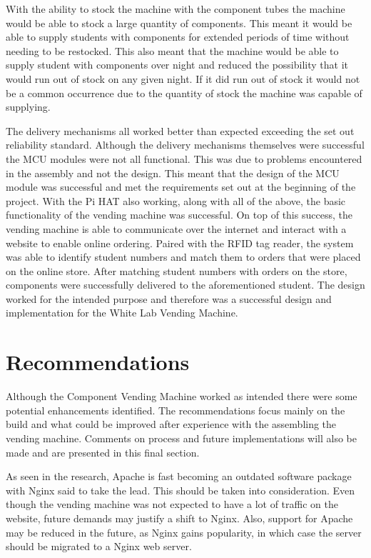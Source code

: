 \documentclass[a4paper,11pt]{article}
\numberwithin{figure}{section}
\numberwithin{table}{section}
\begin{document}
With the ability to stock the machine with the component tubes the machine would be able to stock a large quantity of components. This meant it would be able to supply students with components for extended periods of time without needing to be restocked. This also meant that the machine would be able to supply student with components over night and reduced the possibility that it would run out of stock on any given night. If it did run out of stock it would not be a common occurrence due to the quantity of stock the machine was capable of supplying.

The delivery mechanisms all worked better than expected exceeding the set out reliability standard. Although the delivery mechanisms themselves were successful the MCU modules were not all functional. This was due to problems encountered in the assembly and not the design. This meant that the design of the MCU module was successful and met the requirements set out at the beginning of the project. With the Pi HAT also working, along with all of the above, the basic functionality of the vending machine was successful. On top of this success, the vending machine is able to communicate over the internet and interact with a website to enable online ordering. Paired with the RFID tag reader, the system was able to identify student numbers and match them to orders that were placed on the online store. After matching student numbers with orders on the store, components were successfully delivered to the aforementioned student. The design worked for the intended purpose and therefore was a successful design and implementation for the White Lab Vending Machine.

\newpage

\section{Recommendations}\thispagestyle{sectionstart}
Although the Component Vending Machine worked as intended there were some potential enhancements identified. The recommendations focus mainly on the build and what could be improved after experience with the assembling the vending machine. Comments on process and future implementations will also be made and are presented in this final section.

As seen in the research, Apache is fast becoming an outdated software package with Nginx said to take the lead. This should be taken into consideration. Even though the vending machine was not expected to have a lot of traffic on the website, future demands may justify a shift to Nginx. Also, support for Apache may be reduced in the future, as Nginx gains popularity, in which case the server should be migrated to a Nginx web server. 
\end{document}

